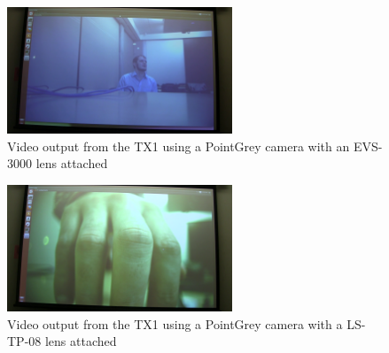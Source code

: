 \documentclass[letterpaper,10pt,titlepage]{IEEEtran}
\begin{document}
\begin{figure}[!ht]
  \caption{Video output from the TX1 using a PointGrey camera with an EVS-3000 lens attached}
	  \centering
		    \includegraphics[width=0.6\textwidth]{images/vlcsnap-2016-02-11-17h42m53s150.png}
				\end{figure}
\begin{figure}[!ht]
  \caption{Video output from the TX1 using a PointGrey camera with a LS-TP-08 lens attached}
	  \centering
		    \includegraphics[width=0.6\textwidth]{images/vlcsnap-2016-02-11-17h42m30s486.png}
				\end{figure}

   
\end{document}
